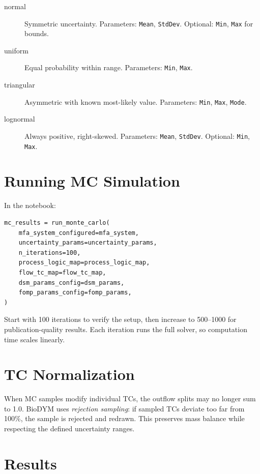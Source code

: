 \begin{description}
  \item[normal] Symmetric uncertainty. Parameters: \texttt{Mean}, \texttt{StdDev}. Optional: \texttt{Min}, \texttt{Max} for bounds.
  \item[uniform] Equal probability within range. Parameters: \texttt{Min}, \texttt{Max}.
  \item[triangular] Asymmetric with known most-likely value. Parameters: \texttt{Min}, \texttt{Max}, \texttt{Mode}.
  \item[lognormal] Always positive, right-skewed. Parameters: \texttt{Mean}, \texttt{StdDev}. Optional: \texttt{Min}, \texttt{Max}.
\end{description}

\section{Running MC Simulation}

In the notebook:

\begin{lstlisting}[style=python]
mc_results = run_monte_carlo(
    mfa_system_configured=mfa_system,
    uncertainty_params=uncertainty_params,
    n_iterations=100,
    process_logic_map=process_logic_map,
    flow_tc_map=flow_tc_map,
    dsm_params_config=dsm_params,
    fomp_params_config=fomp_params,
)
\end{lstlisting}

\begin{tipbox}
Start with 100 iterations to verify the setup, then increase to 500--1000 for publication-quality results. Each iteration runs the full solver, so computation time scales linearly.
\end{tipbox}

\section{TC Normalization}

When MC samples modify individual TCs, the outflow splits may no longer sum to 1.0. BioDYM uses \emph{rejection sampling}: if sampled TCs deviate too far from 100\%, the sample is rejected and redrawn. This preserves mass balance while respecting the defined uncertainty ranges.

\section{Results}

